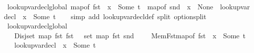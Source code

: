 \begin{isabellebody}
\endisatagproof
{\isafoldproof}%
%
\isadelimproof
\isanewline
%
\endisadelimproof
\isanewline
{}\isamarkupfalse%
\ lookup{\isacharunderscore}{\kern0pt}var{\isacharunderscore}{\kern0pt}decl{\isacharunderscore}{\kern0pt}global{\isacharcolon}{\kern0pt}\ {\isachardoublequoteopen}map{\isacharunderscore}{\kern0pt}of\ {\isacharparenleft}{\kern0pt}fst\ {\isasymLambda}{\isacharparenright}{\kern0pt}\ x\ {\isacharequal}{\kern0pt}\ Some\ t\ {\isasymLongrightarrow}\ map{\isacharunderscore}{\kern0pt}of\ {\isacharparenleft}{\kern0pt}snd\ {\isasymLambda}{\isacharparenright}{\kern0pt}\ x\ {\isacharequal}{\kern0pt}\ None\ {\isasymLongrightarrow}\ lookup{\isacharunderscore}{\kern0pt}var{\isacharunderscore}{\kern0pt}decl\ {\isasymLambda}\ x\ {\isacharequal}{\kern0pt}\ Some\ t{\isachardoublequoteclose}\isanewline
%
\isadelimproof
\ \ %
\endisadelimproof
%
\isatagproof
{}\isamarkupfalse%
\ {\isacharparenleft}{\kern0pt}simp\ add{\isacharcolon}{\kern0pt}\ lookup{\isacharunderscore}{\kern0pt}var{\isacharunderscore}{\kern0pt}decl{\isacharunderscore}{\kern0pt}def\ split{\isacharcolon}{\kern0pt}\ option{\isachardot}{\kern0pt}split{\isacharparenright}{\kern0pt}%
\endisatagproof
{\isafoldproof}%
%
\isadelimproof
\isanewline
%
\endisadelimproof
\isanewline
{}\isamarkupfalse%
\ lookup{\isacharunderscore}{\kern0pt}var{\isacharunderscore}{\kern0pt}decl{\isacharunderscore}{\kern0pt}global{\isacharunderscore}{\kern0pt}{}{\isacharcolon}{\kern0pt}\ \isanewline
\ \ \ Disj{\isacharcolon}{\kern0pt}{\isachardoublequoteopen}set\ {\isacharparenleft}{\kern0pt}map\ fst\ {\isacharparenleft}{\kern0pt}fst\ {\isasymLambda}{\isacharparenright}{\kern0pt}{\isacharparenright}{\kern0pt}\ {\isasyminter}\ set\ {\isacharparenleft}{\kern0pt}map\ fst\ {\isacharparenleft}{\kern0pt}snd\ {\isasymLambda}{\isacharparenright}{\kern0pt}{\isacharparenright}{\kern0pt}\ {\isacharequal}{\kern0pt}\ {\isacharbraceleft}{\kern0pt}{\isacharbraceright}{\kern0pt}{\isachardoublequoteclose}\ \ MemFst{\isacharcolon}{\kern0pt}{\isachardoublequoteopen}map{\isacharunderscore}{\kern0pt}of\ {\isacharparenleft}{\kern0pt}fst\ {\isasymLambda}{\isacharparenright}{\kern0pt}\ x\ {\isacharequal}{\kern0pt}\ Some\ t{\isachardoublequoteclose}\isanewline
\ \ \ {\isachardoublequoteopen}lookup{\isacharunderscore}{\kern0pt}var{\isacharunderscore}{\kern0pt}decl\ {\isasymLambda}\ x\ {\isacharequal}{\kern0pt}\ Some\ t{\isachardoublequoteclose}\isanewline
%
\isadelimproof
\ \ %
\endisadelimproof
%
\isatagproof
{}\isamarkupfalse%

\end{isabellebody}
